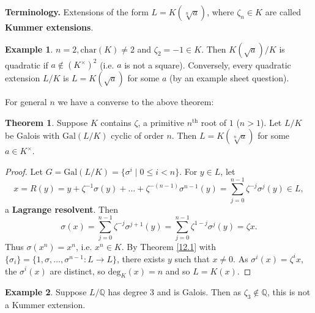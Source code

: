 \documentclass{article}
\theoremstyle{definition}
\newtheorem{theorem}{Theorem}[section]
\newtheorem{example}{Example}[section]
\begin{document}
\textbf{Terminology.} Extensions of the form $L=K(\sqrt[n]{a})$, where $\zeta_n \in K$ are called \textbf{Kummer extensions}. 
\begin{example}
    $n=2, \text{char}(K)\neq 2$ and $\zeta_2 = -1 \in K$. Then $K(\sqrt{a})/K$ is quadratic if $a \not\in (K^\times)^2$ (i.e. $a$ is not a square). Conversely, every quadratic extension $L/K$ is $L=K(\sqrt{a})$ for some $a$ (by an example sheet question).
\end{example}
For general $n$ we have a converse to the above theorem:
\begin{theorem}\label{12.5}
    Suppose $K$ contains $\zeta$, a primitive $n^{\text{th}}$ root of $1$ ($n>1$). Let $L/K$ be Galois with $\text{Gal}(L/K)$ cyclic of order $n$. Then $L=K(\sqrt[n]{a})$ for some $a \in K^\times$.
\end{theorem}
\begin{proof}
    Let $G=\text{Gal}(L/K)=\{\sigma^i \mid 0\le i<n\}$. For $y \in L$, let $$x=R(y)=y + \zeta ^{-1}\sigma(y) + \ldots + \zeta^{-(n-1)}\sigma^{n-1}(y) = \sum_{j=0}^{n-1} \zeta^{-j}\sigma^j(y) \in L,$$
    a \textbf{Lagrange resolvent}. Then $$\sigma(x)=\sum_{j=0}^{n-1} \zeta^{-j}\sigma^{j+1}(y)=\sum_{j=0}^{n-1} \zeta^{1-j}\sigma^{j}(y) = \zeta x.$$ 
    Thus $\sigma(x^n)=x^n$, i.e. $x^n \in K$. By Theorem \ref{12.1} with $\{\sigma_i\} = \{1,\sigma,\ldots,\sigma^{n-1} : L \to L\}$, there exists $y$ such that $x\neq 0$. As $\sigma^i(x)=\zeta^i x$, the $\sigma^i(x)$ are distinct, so $\text{deg}_K(x)=n$ and so $L=K(x)$.
\end{proof}
\begin{example}
    Suppose $L/\mathbb{Q}$ has degree 3 and is Galois. Then as $\zeta_3 \not\in \mathbb{Q}$, this is not a Kummer extension.
\end{example}
\end{document}
